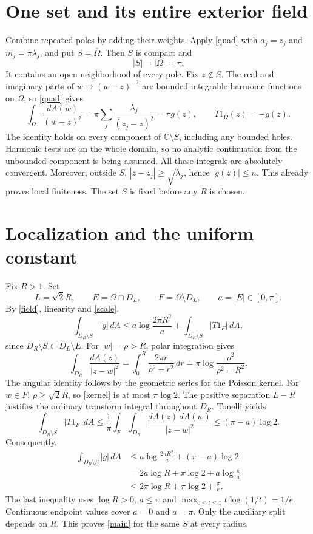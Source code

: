 \documentclass[11pt]{article}
\newcommand{\C}{\mathbb C}
\newcommand{\dd}{\,dA}
\begin{document}
\section{One set and its entire exterior field}
Combine repeated poles by adding their weights. Apply \eqref{quad}
with \(a_j=z_j\) and \(m_j=\pi\lambda_j\), and put
\(S=\overline\Omega\). Then \(S\) is compact and
\[
 |S|=|\Omega|=\pi.
\]
It contains an open neighborhood of every pole. Fix \(z\notin S\).
The real and imaginary parts of \(w\mapsto(w-z)^{-2}\) are bounded
integrable harmonic functions on \(\Omega\), so \eqref{quad} gives
\begin{equation}\label{field}
 \int_\Omega\frac{dA(w)}{(w-z)^2}
  =\pi\sum_j\frac{\lambda_j}{(z_j-z)^2}
  =\pi g(z),\qquad T1_\Omega(z)=-g(z).
\end{equation}
The identity holds on every component of \(\C\setminus S\), including
any bounded holes. Harmonic tests are on the whole domain, so no
analytic continuation from the unbounded component is being assumed.
All these integrals are absolutely convergent.
Moreover, outside \(S\), \(|z-z_j|\ge\sqrt{\lambda_j}\), hence
\(|g(z)|\le n\). This already proves local finiteness.
The set \(S\) is fixed before any \(R\) is chosen.

\section{Localization and the uniform constant}
Fix \(R>1\). Set
\[
 L=\sqrt2R,\qquad E=\Omega\cap D_L,\qquad
 F=\Omega\setminus D_L,\qquad a=|E|\in[0,\pi].
\]
By \eqref{field}, linearity and \eqref{scale},
\begin{equation}\label{near}
 \int_{D_R\setminus S}|g|\dd
 \le a\log\frac{2\pi R^2}{a}
       +\int_{D_R\setminus S}|T1_F|\dd,
\end{equation}
since \(D_R\setminus S\subset D_L\setminus E\).
For \(|w|=\rho>R\), polar integration gives
\begin{equation}\label{kernel}
 \int_{D_R}\frac{dA(z)}{|z-w|^2}
 =\int_0^R\frac{2\pi r}{\rho^2-r^2}\,dr
 =\pi\log\frac{\rho^2}{\rho^2-R^2}.
\end{equation}
The angular identity follows by the geometric series for the Poisson
kernel. For \(w\in F\), \(\rho\ge\sqrt2R\), so \eqref{kernel}
is at most \(\pi\log2\). The positive separation \(L-R\) justifies
the ordinary transform integral throughout \(D_R\). Tonelli yields
\[
 \int_{D_R\setminus S}|T1_F|\dd
 \le\frac1\pi\int_F\int_{D_R}\frac{dA(z)\,dA(w)}{|z-w|^2}
 \le(\pi-a)\log2.
\]
Consequently,
\begin{align*}
 \int_{D_R\setminus S}|g|\dd
 &\le a\log\frac{2\pi R^2}{a}+(\pi-a)\log2\\
 &=2a\log R+\pi\log2+a\log\frac\pi a\\
 &\le2\pi\log R+\pi\log2+\frac\pi e .
\end{align*}
The last inequality uses \(\log R>0\), \(a\le\pi\) and
\(\max_{0\le t\le1}t\log(1/t)=1/e\).
Continuous endpoint values cover \(a=0\) and \(a=\pi\).
Only the auxiliary split depends on \(R\). This proves
\eqref{main} for the same \(S\) at every radius.
\end{document}
